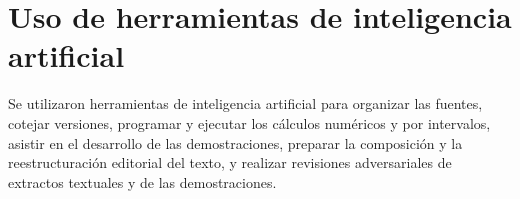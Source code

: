 \section*{Uso de herramientas de inteligencia artificial}
Se utilizaron herramientas de inteligencia artificial para organizar las fuentes, cotejar
versiones, programar y ejecutar los cálculos numéricos y por intervalos, asistir en el desarrollo
de las demostraciones, preparar la composición y la reestructuración editorial del texto, y
realizar revisiones adversariales de extractos textuales y de las demostraciones.
